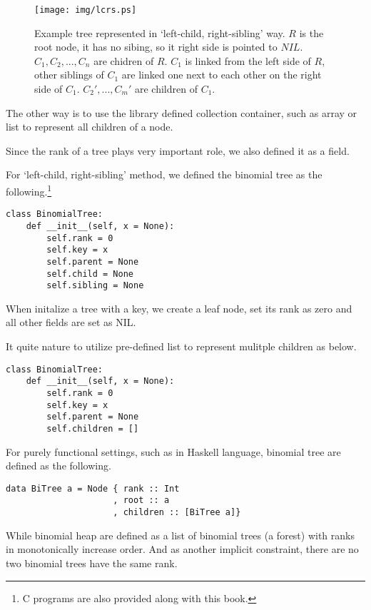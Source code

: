 \documentclass{article}
\begin{document}
\begin{figure}[htbp]
  \centering
  \texttt{[image: img/lcrs.ps]}
  \caption{Example tree represented in `left-child, right-sibling' way. $R$ is the root node, it has no sibing, so it right side is pointed to $NIL$. $C_1, C_2, ..., C_n$ are chidren of $R$. $C_1$ is linked from the left side of $R$, other siblings of $C_1$ are linked one next to each other on the right side of $C_1$. $C_2', ..., C_m'$ are children of $C_1$.} \label{fig:lcrs}
\end{figure}

The other way is to use the library defined collection container, such
as array or list to represent all children of a node.

Since the rank of a tree plays very important role, we also defined
it as a field.

For `left-child, right-sibling' method, we defined the binomial tree
as the following.\footnote{C programs are also provided along with this book.}

\lstset{language=Python}
\begin{lstlisting}
class BinomialTree:
    def __init__(self, x = None):
        self.rank = 0
        self.key = x
        self.parent = None
        self.child = None
        self.sibling = None
\end{lstlisting}

When initalize a tree with a key, we create a leaf node, set its rank
as zero and all other fields are set as NIL.

It quite nature to utilize pre-defined list to represent mulitple children
as below.

\begin{lstlisting}
class BinomialTree:
    def __init__(self, x = None):
        self.rank = 0
        self.key = x
        self.parent = None
        self.children = []
\end{lstlisting}

For purely functional settings, such as in Haskell language, binomial tree
are defined as the following.

\lstset{language=Haskell}
\begin{lstlisting}
data BiTree a = Node { rank :: Int
                     , root :: a
                     , children :: [BiTree a]} 
\end{lstlisting}

While binomial heap are defined as a list of binomial trees (a forest) with 
ranks in monotonically increase order. And as another implicit constraint,
there are no two binomial trees have the same rank.
\end{document}
